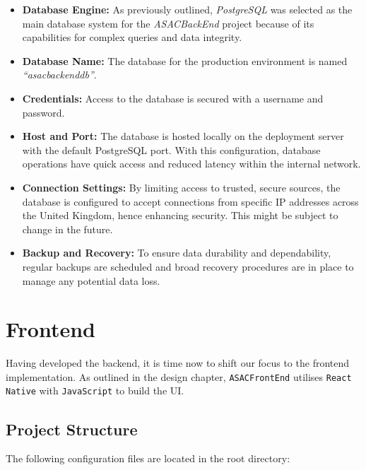 \begin{itemize}
    \item \textbf{Database Engine:} As previously outlined, \textit{PostgreSQL} was selected as the main database system for the \textit{ASACBackEnd} project because of its capabilities for complex queries and data integrity.
    \item \textbf{Database Name:} The database for the production environment is named \textit{``asacbackenddb''}.
    \item \textbf{Credentials:} Access to the database is secured with a username and password.
    \item \textbf{Host and Port:} The database is hosted locally on the deployment server with the default PostgreSQL port. With this configuration, database operations have quick access and reduced latency within the internal network.
    \item \textbf{Connection Settings:} By limiting access to trusted, secure sources, the database is configured to accept connections from specific IP addresses across the United Kingdom, hence enhancing security. This might be subject to change in the future.
    \item \textbf{Backup and Recovery:} To ensure data durability and dependability, regular backups are scheduled and broad recovery procedures are in place to manage any potential data loss.
\end{itemize}

\section{Frontend}

Having developed the backend, it is time now to shift our focus to the frontend implementation. As outlined in the design chapter, \texttt{ASACFrontEnd} utilises \texttt{React Native} with \texttt{JavaScript} to build the UI. 

\subsection{Project Structure}

The following configuration files are located in the root directory: 

